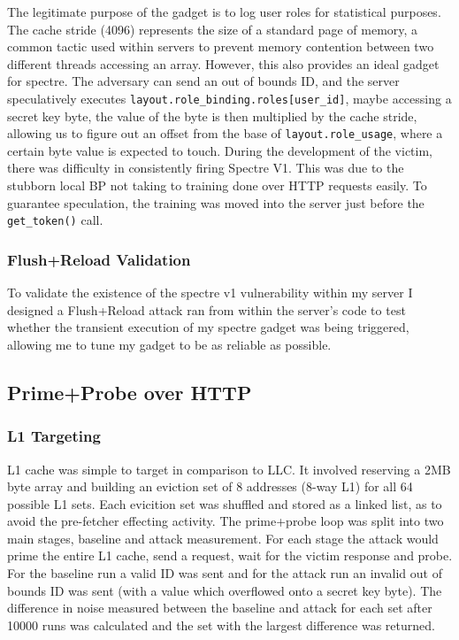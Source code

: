 \documentclass[11pt,a4paper, notitlepage]{article}
\begin{document}
The legitimate purpose of the gadget is to log user roles for statistical purposes. The cache stride (4096) represents the size of a standard page of 
memory, a common tactic used within servers to prevent memory contention between two different threads accessing an array. However, this also provides an ideal gadget for spectre.  
The adversary can send an out of bounds ID, and the server speculatively executes \texttt{layout.role\_binding.roles[user\_id]}, maybe accessing a secret key byte, 
the value of the byte is then multiplied by the cache stride, allowing us to figure out an offset from the base of \texttt{layout.role\_usage}, where a certain byte value is expected to touch.
During the development of the victim, there was difficulty in consistently firing Spectre V1. This was due to the stubborn local BP
not taking to training done over HTTP requests easily. To guarantee speculation, the training was moved into the server just before the \texttt{get\_token()} call. 
\subsubsection{Flush+Reload Validation}
To validate the existence of the spectre v1 vulnerability within my server I designed a Flush+Reload attack ran from within the server's code to 
test whether the transient execution of my spectre gadget was being triggered, allowing me to tune my gadget to be as reliable as possible. 

\subsection{Prime+Probe over HTTP}
\subsubsection{L1 Targeting}
L1 cache was simple to target in comparison to LLC. It involved reserving a 2MB byte array and building an eviction set of 8 addresses (8-way L1) for all 64 possible L1 sets.
Each evicition set was shuffled and stored as a linked list, as to avoid the pre-fetcher effecting activity. The prime+probe loop was split into two main stages, 
baseline and attack measurement. For each stage the attack would prime the entire L1 cache, send a request, wait for the victim response and probe. 
For the baseline run a valid ID was sent and for the attack run an invalid out of bounds ID was sent (with a value which overflowed onto a secret key byte).
The difference in noise measured between the baseline and attack for each set after 10000 runs was calculated and the set with the largest difference was returned.
\end{document}
